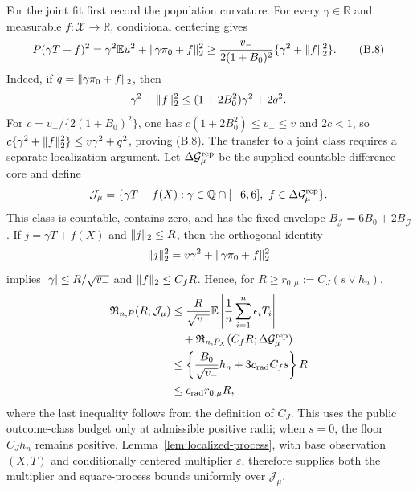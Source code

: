 For the joint fit first record the population curvature.  For every
\(\gamma\in\mathbb R\) and measurable \(f:\mathcal X\to\mathbb R\),
conditional centering gives
\[
 P(\gamma T+f)^2=\gamma^2\mathbb E u^2+\lVert \gamma\pi_0+f\rVert_2^2
 \ge \frac{v_-}{2(1+B_0)^2}\{\gamma^2+\lVert f\rVert_2^2\}.
\tag{B.8}
\]
Indeed, if \(q=\lVert \gamma\pi_0+f\rVert_2\), then
\[
 \gamma^2+\lVert f\rVert_2^2
 \le (1+2B_0^2)\gamma^2+2q^2.
\]
For \(c=v_-/\{2(1+B_0)^2\}\), one has
\(c(1+2B_0^2)\le v_-\le v\) and \(2c<1\), so
\(c\{\gamma^2+\lVert f\rVert_2^2\}\le v\gamma^2+q^2\), proving (B.8).
The transfer to a joint class requires a separate localization argument.
Let \(\Delta\mathcal G_\mu^{\rm rep}\) be the supplied countable difference core and
define
\[
 \mathcal J_\mu=\{\gamma T+f(X):
 \gamma\in\mathbb Q\cap[-6,6],\ f\in\Delta\mathcal G_\mu^{\rm rep}\}.
\]
This class is countable, contains zero, and has the fixed envelope
\(B_{\mathcal J}=6B_0+2B_{\mathcal G}\).  If
\(j=\gamma T+f(X)\) and \(\lVert j\rVert_2\le R\), then the orthogonal identity
\[
 \lVert j\rVert_2^2=v\gamma^2+\lVert \gamma\pi_0+f\rVert_2^2
\]
implies
\(\lvert \gamma\rvert\le R/\sqrt{v_-}\) and \(\lVert f\rVert_2\le C_fR\).  Hence, for
\(R\ge r_{0,\mu}:=C_J(s\vee h_n)\),
\[
\begin{aligned}
 \mathfrak R_{n,P}(R;\mathcal J_\mu)
 &\le \frac{R}{\sqrt{v_-}}\mathbb E\left|\frac{1}{n}
       \sum_{i=1}^n\epsilon_iT_i\right| \\
 &\quad +\mathfrak R_{n,P_X}(C_fR;\Delta\mathcal G_\mu^{\rm rep}) \\
 &\le\left\{\frac{B_0}{\sqrt{v_-}}h_n
             +3c_{\rm rad}C_fs\right\}R \\
 &\le c_{\rm rad}r_{0,\mu}R,
\end{aligned}
\]
where the last inequality follows from the definition of \(C_J\).  This uses
the public outcome-class budget only at admissible positive radii; when
\(s=0\), the floor \(C_Jh_n\) remains positive.
Lemma~\ref{lem:localized-process}, with
base observation \((X,T)\) and conditionally centered multiplier
\(\varepsilon\), therefore supplies both the multiplier and square-process
bounds uniformly over \(\mathcal J_\mu\).

